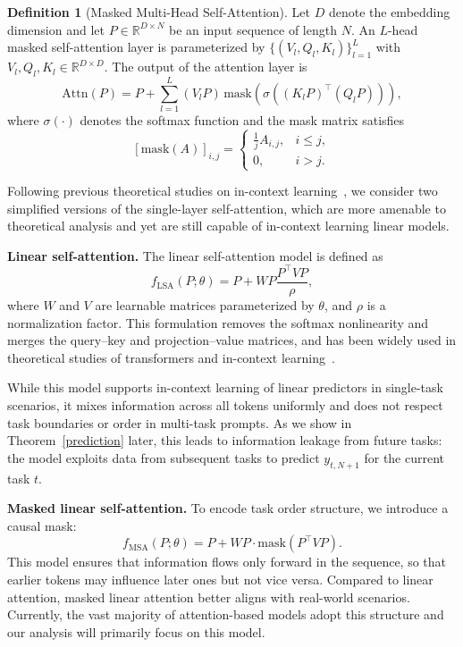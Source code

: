 \documentclass{article}
\theoremstyle{plain}
\theoremstyle{definition}
\newtheorem{definition}[theorem]{Definition}
\theoremstyle{remark}
\begin{document}
\begin{definition}[Masked Multi-Head Self-Attention]
Let $D$ denote the embedding dimension and let $P\in\mathbb{R}^{D\times N}$ be an input sequence of length $N$. An $L$-head masked self-attention layer is parameterized by $\{(V_l,Q_l,K_l)\}_{l=1}^L$ with $V_l,Q_l,K_l\in\mathbb{R}^{D\times D}$. The output of the attention layer is
\[
\mathrm{Attn}(P)
= P + \sum_{l=1}^L (V_l P)\,
\mathrm{mask}\!\left(
\sigma\!\left((K_l P)^\top(Q_l P)\right)
\right),
\]
where $\sigma(\cdot)$ denotes the softmax function and the mask matrix satisfies
\[
[\mathrm{mask}(A)]_{i,j} =
\begin{cases}
\frac{1}{j}A_{i,j}, & i\le j,\\
0, & i>j.
\end{cases}
\]
\end{definition}

Following previous theoretical studies on in-context learning~\cite{zhang2024trained, Lu_2025}, we consider two simplified versions of the single-layer self-attention, which are more amenable to theoretical analysis and yet are still capable of in-context learning linear models.

\noindent \textbf{Linear self-attention.}
The linear self-attention model is defined as
\[
f_{\mathrm{LSA}}(P;\theta)
= P + WP\frac{P^\top VP}{\rho},
\]
where $W$ and $V$ are learnable matrices parameterized by $\theta$, and $\rho$ is a normalization factor. This formulation removes the softmax nonlinearity and merges the query--key and projection--value matrices, and has been widely used in theoretical studies of transformers and in-context learning~\cite{zhang2024trained,ahn2023transformers,olsson2022context,pmlr-v202-li23l}.

While this model supports in-context learning of linear predictors in single-task scenarios, it mixes information across all tokens uniformly and does not respect task boundaries or order in multi-task prompts. As we show in Theorem~\ref{prediction} later, this leads to information leakage from future tasks: the model exploits data from subsequent tasks to predict $y_{t, N+1}$ for the current task $t$.

\noindent \textbf{Masked linear self-attention.}
To encode task order structure, we introduce a causal mask:
\[
f_{\mathrm{MSA}}(P;\theta)
= P + WP\cdot
\mathrm{mask}\!\left(P^\top VP\right).
\]
This model ensures that information flows only forward in the sequence, so that earlier tokens may influence later ones but not vice versa. Compared to linear attention, masked linear attention better aligns with real-world scenarios. Currently, the vast majority of attention-based models adopt this structure and our analysis will primarily focus on this model. 
\end{document}
